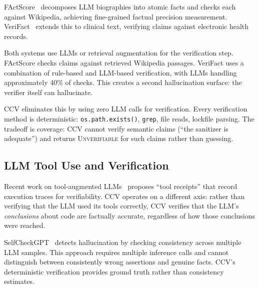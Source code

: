 FActScore~\cite{min2023factscore} decomposes LLM biographies into atomic facts and checks each against Wikipedia, achieving fine-grained factual precision measurement. VeriFact~\cite{wei2024verifact} extends this to clinical text, verifying claims against electronic health records.

Both systems use LLMs or retrieval augmentation for the verification step. FActScore checks claims against retrieved Wikipedia passages. VeriFact uses a combination of rule-based and LLM-based verification, with LLMs handling approximately 40\% of checks. This creates a second hallucination surface: the verifier itself can hallucinate.

CCV eliminates this by using zero LLM calls for verification. Every verification method is deterministic: \texttt{os.path.exists()}, \texttt{grep}, file reads, lockfile parsing. The tradeoff is coverage: CCV cannot verify semantic claims (``the sanitizer is adequate'') and returns \textsc{Unverifiable} for such claims rather than guessing.

\subsection{LLM Tool Use and Verification}

Recent work on tool-augmented LLMs~\cite{wang2024toolreceipts} proposes ``tool receipts'' that record execution traces for verifiability. CCV operates on a different axis: rather than verifying that the LLM used its tools correctly, CCV verifies that the LLM's \emph{conclusions} about code are factually accurate, regardless of how those conclusions were reached.

SelfCheckGPT~\cite{jiang2023selfcheck} detects hallucination by checking consistency across multiple LLM samples. This approach requires multiple inference calls and cannot distinguish between consistently wrong assertions and genuine facts. CCV's deterministic verification provides ground truth rather than consistency estimates.
